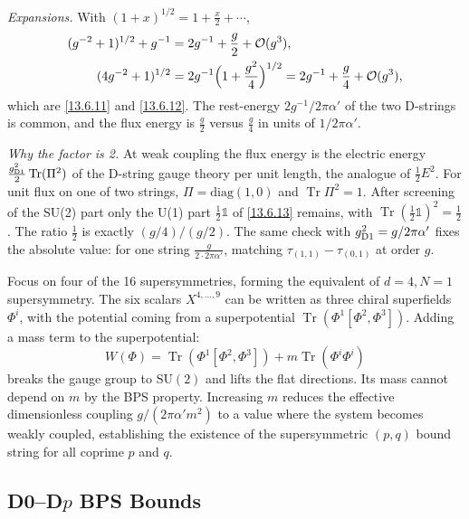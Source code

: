 \begin{tcolorbox}[breakable]
	\begin{remark}
		\textit{Expansions.} With $(1+x)^{1/2}=1+\frac x2+\cdots$,
		\begin{align*}
			(g^{-2}+1)^{1/2}+g^{-1} &= 2g^{-1}+\frac g2+\mathcal O(g^3),\\
			(4g^{-2}+1)^{1/2} &= 2g^{-1}\Bigl(1+\frac{g^2}{4}\Bigr)^{1/2} = 2g^{-1}+\frac g4+\mathcal O(g^3),
		\end{align*}
		which are \eqref{13.6.11} and \eqref{13.6.12}. The rest-energy $2g^{-1}/2\pi\alpha'$ of the two D-strings is common, and the flux energy is $\frac{g}{2}$ versus $\frac g4$ in units of $1/2\pi\alpha'$.

		\textit{Why the factor is 2.} At weak coupling the flux energy is the electric energy $\frac{g_{\rm D1}^2}{2}\operatorname{Tr}(\Pi^2)$ of the D-string gauge theory per unit length, the analogue of $\frac12E^2$. For unit flux on one of two strings, $\Pi=\mathrm{diag}(1,0)$ and $\operatorname{Tr}\Pi^2=1$. After screening of the SU(2) part only the U(1) part $\frac12\mathbb 1$ of \eqref{13.6.13} remains, with $\operatorname{Tr}(\frac12\mathbb 1)^2=\frac12$. The ratio $\frac12$ is exactly $(g/4)/(g/2)$. The same check with $g_{\rm D1}^2=g/2\pi\alpha'$ fixes the absolute value: for one string $\frac{g}{2\cdot2\pi\alpha'}$, matching $\tau_{(1,1)}-\tau_{(0,1)}$ at order $g$.
	\end{remark}
\end{tcolorbox}

Focus on four of the 16 supersymmetries, forming the equivalent of $d = 4, N = 1$ supersymmetry. The six scalars $X^{4,\dots,9}$ can be written as three chiral superfields $\Phi^i$, with the potential coming from a superpotential $\operatorname{Tr}(\Phi^1[\Phi^2,\Phi^3])$. Adding a mass term to the superpotential:
\begin{equation}
	W(\Phi) = \operatorname{Tr}(\Phi^1[\Phi^2,\Phi^3]) + m\operatorname{Tr}(\Phi^i\Phi^i) \label{13.6.14}
\end{equation}
breaks the gauge group to $\mathrm{SU}(2)$ and lifts the flat directions. Its mass cannot depend on $m$ by the BPS property. Increasing $m$ reduces the effective dimensionless coupling $g/(2\pi\alpha' m^2)$ to a value where the system becomes weakly coupled, establishing the existence of the supersymmetric $(p,q)$ bound string for all coprime $p$ and $q$.

\subsection*{D0--D$p$ BPS Bounds}

